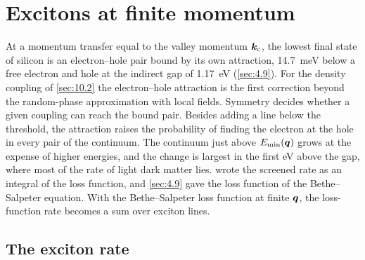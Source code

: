 \section{Excitons at finite momentum}\label{sec:10.5}

At a momentum transfer equal to the valley momentum $\bm{k}_{\mathrm{c}}$, the lowest final state of silicon is an electron--hole pair bound by its own attraction, \SI{14.7}{meV} below a free electron and hole at the indirect gap of \SI{1.17}{eV} (\cref{sec:4.9}). For the density coupling of \cref{sec:10.2} the electron--hole attraction is the first correction beyond the random-phase approximation with local fields. Symmetry decides whether a given coupling can reach the bound pair. Besides adding a line below the threshold, the attraction raises the probability of finding the electron at the hole in every pair of the continuum. The continuum just above $E_{\mathrm{min}}(\bm{q})$ grows at the expense of higher energies, and the change is largest in the first eV above the gap, where most of the rate of light dark matter lies.  wrote the screened rate as an integral of the loss function, and \cref{sec:4.9} gave the loss function of the Bethe--Salpeter equation. With the Bethe--Salpeter loss function at finite $\bm{q}$, the loss-function rate becomes a sum over exciton lines.

\subsection{The exciton rate}\label{sec:10.5-rate}

